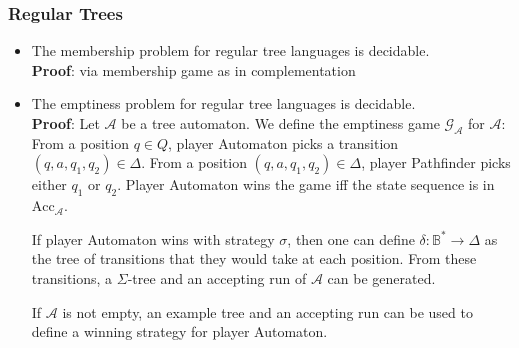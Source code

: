 \documentclass{article}
\begin{document}
\subsubsection{Regular Trees}
\begin{itemize}
	\item The membership problem for regular tree languages is decidable. \\
		\textbf{Proof}: via membership game as in complementation
	\item The emptiness problem for regular tree languages is decidable. \\
		\textbf{Proof}: Let $\mathcal{A}$ be a tree automaton. We define the emptiness game $\mathcal{G}_\mathcal{A}$ for $\mathcal{A}$: From a position $q \in Q$, player Automaton picks a transition $(q, a, q_1, q_2) \in \Delta$. From a position $(q, a, q_1, q_2) \in \Delta$, player Pathfinder picks either $q_1$ or $q_2$. Player Automaton wins the game iff the state sequence is in $\text{Acc}_\mathcal{A}$.
		
		If player Automaton wins with strategy $\sigma$, then one can define $\delta : \mathbb{B}^* \rightarrow \Delta$ as the tree of transitions that they would take at each position. From these transitions, a $\Sigma$-tree and an accepting run of $\mathcal{A}$ can be generated.
		
		If $\mathcal{A}$ is not empty, an example tree and an accepting run can be used to define a winning strategy for player Automaton.
\end{itemize}
\end{document}
